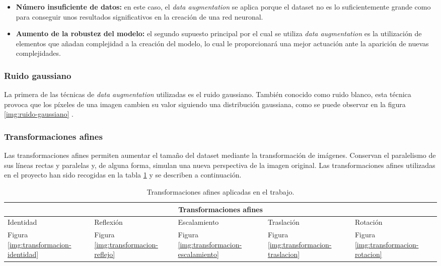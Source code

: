 \begin{itemize}
	\item \textbf{Número insuficiente de datos:} en este caso, el \textit{data augmentation} se aplica porque el dataset no es lo suficientemente grande como para conseguir unos resultados 
significativos en la creación de una red neuronal.
	\item \textbf{Aumento de la robustez del modelo:} el segundo supuesto principal por el cual se utiliza \textit{data augmentation} es la utilización de elementos que añadan complejidad a la
creación del modelo, lo cual le proporcionará una mejor actuación ante la aparición de nuevas complejidades.
\end{itemize}

\subsubsection{Ruido gaussiano}

La primera de las técnicas de \textit{data augmentation} utilizadas es el ruido gaussiano. 
También conocido como ruido blanco, esta técnica provoca que los píxeles de una imagen cambien su valor siguiendo una distribución gaussiana, como se puede observar en la figura \ref{img:ruido-gaussiano} .


\subsubsection{Transformaciones afines} \label{transformacionesafines}

Las transformaciones afines permiten aumentar el tamaño del dataset mediante la transformación de imágenes. Conservan el paralelismo de sus líneas rectas y paralelas y, de alguna forma, simulan una nueva perspectiva de la imagen original.
Las transformaciones afines utilizadas en el proyecto han sido recogidas en la tabla \ref{tabla:transformaciones-afines} y se describen a continuación.

\begin{table}[h!]
\begin{tabular}{ |p{2cm}|p{1.8cm}|p{2.2cm} |p{2cm}|p{1.8cm}|}
	\hline
	\multicolumn{5}{|c|}{Transformaciones afines}\\ 
	\hline
	Identidad & Reflexión &Escalamiento & Traslación  & Rotación\\
	\hline
	Figura \ref{img:transformacion-identidad} & Figura \ref{img:transformacion-reflejo}     & Figura \ref{img:transformacion-escalamiento} &   Figura \ref{img:transformacion-traslacion} &   Figura \ref{img:transformacion-rotacion}\\
	\hline
\end{tabular}
\caption{\label{tabla:transformaciones-afines}Transformaciones afines aplicadas en el trabajo.}
\end{table}


